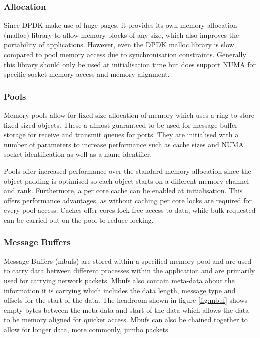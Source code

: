 \documentclass[final_report.tex]{subfiles}
\begin{document}
\subsubsection{Allocation}
Since DPDK make use of huge pages, it provides its own memory allocation (malloc) library to allow memory blocks of any size, which also improves the portability of applications. However, even the DPDK malloc library is slow compared to pool memory access due to synchronisation constraints. Generally this library should only be used at initialisation time but does support NUMA for specific socket memory access and memory alignment.

\subsubsection{Pools}
Memory pools allow for fixed size allocation of memory which uses a ring to store fixed sized objects. These a almost guaranteed to be used for message buffer storage for receive and transmit queues for ports. They are initialised with a number of parameters to increase performance such as cache sizes and NUMA socket identification as well as a name identifier.

Pools offer increased performance over the standard memory allocation since the object padding is optimised so each object starts on a different memory channel and rank. Furthermore, a per core cache can be enabled at initialisation. This offers performance advantages, as without caching per core locks are required for every pool access. Caches offer cores lock free access to data, while bulk requested can be carried out on the pool to reduce locking.

\subsubsection{Message Buffers}
Message Buffers (mbufs) are stored within a specified memory pool and are used to carry data between different processes within the application and are primarily used for carrying network packets. Mbufs also contain meta-data about the information it is carrying which includes the data length, message type and offsets for the start of the data. The headroom shown in figure \ref{fig:mbuf} shows empty bytes between the meta-data and start of the data which allows the data to be memory aligned for quicker access. Mbufs can also be chained together to allow for longer data, more commonly, jumbo packets.
\end{document}
